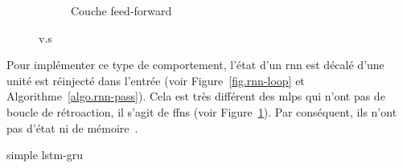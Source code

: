 \begin{figure}[hbt]
\begin{center}
\begin{subfigure}{.4\linewidth}
            \caption{Couche feed-forward}
            \label{fig.ffn-layer}
        \end{subfigure}
    \end{center}
    \caption{ v.s }
    \label{fig.rnn-vs-ffn}
\end{figure}

Pour implémenter ce type de comportement, 
l'état d'un \gls{rnn} est décalé d'une unité est réinjecté dans l'entrée %
(voir Figure~\ref{fig.rnn-loop} et Algorithme~\ref{algo.rnn-pass}).
Cela est très différent des \glspl{mlp} qui n'ont pas de boucle de rétroaction,
il s'agit de \glspl{ffn} (voir Figure~\ref{fig.ffn-layer}).
Par conséquent, ils n'ont pas d'état ni de mémoire~\cite{Fathi_2021}.


{simple}
{lstm-gru}
